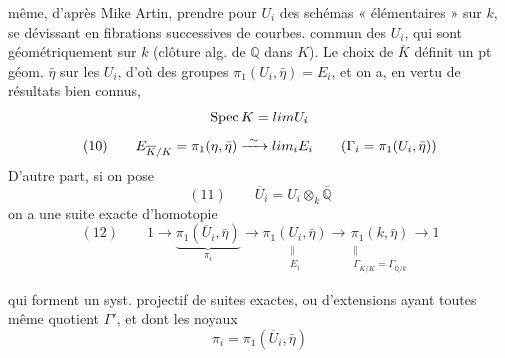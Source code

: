\documentclass[11pt,a4paper]{article}
\begin{document}
même, d'après Mike Artin, prendre pour $U_i$ des schémas « élémentaires » sur $k$, se dévissant en fibrations successives de courbes.   commun des $U_i$, qui sont géométriquement  sur \struck{\ill{}} $k$ (clôture alg. de $\mathbb{Q}$ dans $K$).
Le choix de $\overline{K}$ définit un pt géom. $\bar\eta$ sur les $U_i$, d'où des groupes $\pi_1(U_i, \bar\eta) = E_i$, et on a, en vertu de résultats bien connus,
\[
  \operatorname{Spec} K = \varprojlim U_i
\]
\[
  (10)\qquad E_{\overline{K}/K} = \pi_1(\eta, \bar\eta) \xrightarrow{\ \sim\ } \varprojlim_i E_i
  \qquad (\Gamma_i = \pi_1(U_i, \bar\eta))
\]
D'autre part, si on pose
\[
  (11)\qquad \overline{U}_i = U_i \otimes_k \overline{\mathbb{Q}}
\]
on a  une suite exacte d'homotopie
\[
  (12)\qquad 1 \to \underbrace{\pi_1(\overline{U}_i, \bar\eta)}_{\pi_i}
  \to \underset{\substack{\| \\ E_i}}{\pi_1(U_i, \bar\eta)}
  \to \underset{\substack{\| \\ \Gamma_{\overline{K}/K} = \Gamma_{\overline{\mathbb{Q}}/k}}}{\pi_1(k, \bar\eta)}
  \to 1
\]


qui forment un syst. projectif de suites exactes, ou d'extensions ayant toutes même quotient $\Gamma'$, et dont les noyaux
\[
  \pi_i = \pi_1(\overline{U}_i, \bar\eta)
\]
\end{document}
